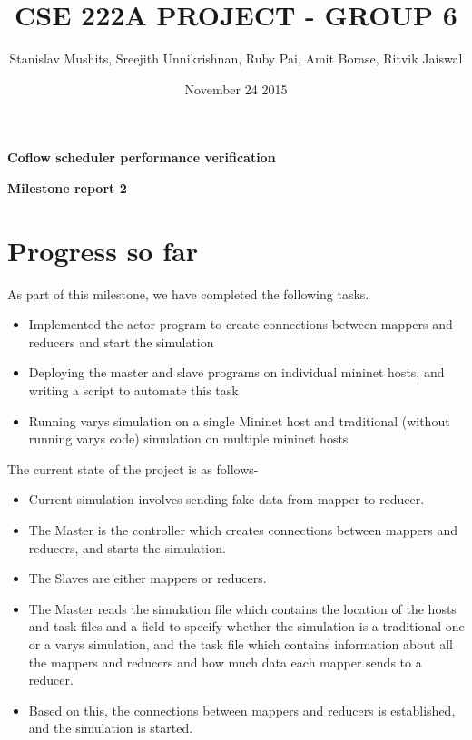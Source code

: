 \documentclass{article}
\title{CSE 222A PROJECT - GROUP 6}
\author{Stanislav Mushits, Sreejith Unnikrishnan, Ruby Pai, Amit Borase, Ritvik Jaiswal }
\date{November 24 2015}
\begin{document}
\maketitle

\begin{center}
\textbf{Coflow scheduler performance verification}
\end{center}

\begin{center}
\textbf{Milestone report 2}
\end{center}

\section{Progress so far}
As part of this milestone, we have completed the following tasks.
\begin{itemize}
	\item Implemented the actor program to create connections between mappers and reducers and start the simulation
	\item Deploying the master and slave programs on individual mininet hosts, and writing a script to automate this task
	\item Running varys simulation on a single Mininet\cite{mininet} host and traditional (without running varys code) simulation on multiple mininet hosts
\end{itemize}
The current state of the project is as follows-
\begin{itemize}
	\item Current simulation involves sending fake data from mapper to reducer.
	\item The Master is the controller which creates connections between mappers and reducers, and starts the simulation.
	\item The Slaves are either mappers or reducers.
	\item The Master reads the simulation file which contains the location of the hosts and task files and a field to specify whether the simulation is a traditional one or a varys simulation, and the task file which contains information about all the mappers and reducers and how much data each mapper sends to a reducer.
	\item Based on this, the connections between mappers and reducers is established, and the simulation is started.
\end{itemize}
\end{document}
